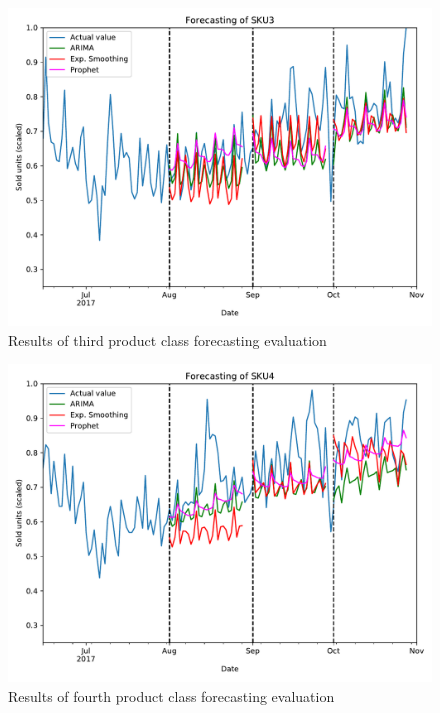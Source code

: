 \documentclass[11pt,a4paper]{article}
\begin{document}
\begin{figure}
  \includegraphics[width=1.2\linewidth]{figures/SKU3_all.pdf}
  \caption{Results of third product class forecasting evaluation}
  \label{fig:sku3_all}
\end{figure}

\begin{figure}
  \includegraphics[width=1.2\linewidth]{figures/SKU4_all.pdf}
  \caption{Results of fourth product class forecasting evaluation}
  \label{fig:sku4_all}
\end{figure}
\end{document}
